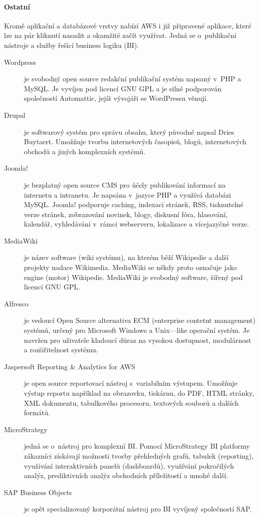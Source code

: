 \paragraph{Ostatní}
Kromě aplikační a databázové vrstvy nabízí AWS i již připravené aplikace, které lze na pár kliknutí nasadit a okamžitě začít využívat. Jedná se o~publikační nástroje a služby řešící business logiku (BI).
\begin{description}
	\item [Wordpress] je svobodný open source redakční publikační systém napsaný v~PHP a MySQL. Je vyvíjen pod licencí GNU GPL a je silně podporován společností Automattic, jejíž vývojáři se WordPressu věnují.\cite{wiki:wordpress}
	\item [Drupal] je softwarový systém pro správu obsahu, který původně napsal Dries Buytaert. Umožňuje tvorbu internetových časopisů, blogů, internetových obchodů a jiných komplexních systémů.\cite{wiki:drupal}
	\item [Joomla!] je bezplatný open source CMS pro účely publikování informací na internetu a intranetu. Je napsána v~jazyce PHP a využívá databázi MySQL. Joomla! podporuje caching, indexaci stránek, RSS, tisknutelné verze stránek, zobrazování novinek, blogy, diskusní fóra, hlasování, kalendář, vyhledávání v~rámci webserveru, lokalizace a vícejazyčné verze.\cite{wiki:joomla}
	\item [MediaWiki] je název software (wiki systému), na kterém běží Wikipedie a další projekty nadace Wikimedia. MediaWiki se někdy proto označuje jako engine (motor) Wikipedie. MediaWiki je svobodný software, šířený pod licencí GNU GPL.\cite{wiki:mediawiki}
	\item [Alfresco] je vedoucí Open Source alternativa ECM (enterprise contetnt management) systémů, určený pro Microsoft Windows a Unix---like operační systém. Je navržen pro uživatele kladoucí důraz na vysokou dostupnost, modulárnost a rozšiřitelnost systému.\cite{wiki:alfresco}
	\item [Jaspersoft Reporting \& Analytics for AWS] je open source reportovací nástroj s~variabilním výstupem. Umožňuje výstup reportu například na obrazovku, tiskárnu, do PDF, HTML stránky, XML dokumentu, tabulkového procesoru, textových souborů a dalších formátů.
	\item [MicroStrategy] jedná se o~nástroj pro komplexní BI. Pomocí MicroStrategy BI platformy zákazníci získávají možnosti tvorby přehledných grafů, tabulek (reporting), využívání interaktivních panelů (dashboardů), využívání pokročilých analýz, prediktivních analýz obchodních příležitostí a mnohé další\cite{oksystem:microstrategy}.
	\item [SAP Business Objects] je opět specializovaný korporátní nástroj pro BI vyvíjený společností SAP.
\end{description}


